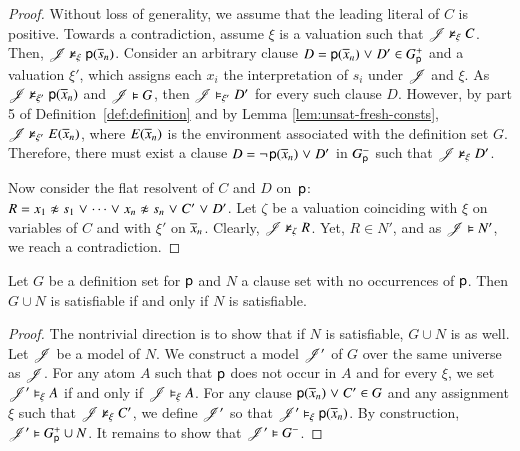 \begin{rep}
\begin{proof}
      Without loss of generality,
      we assume that the leading literal of $C$ is positive.
      Towards a contradiction, assume $\xi$ is a valuation such that $\mathscr{J} \nvDash_\xi C$. Then, $\mathscr{J} \nvDash_\xi
      {\mathsf{p}(\overline{s}_{n})}$. 
      Consider an arbitrary clause $D = {\mathsf{p}}(\overline{x}_{n}) \mathrel{\lor} D'
      \in G^+_{\mathsf{p}}$ and a valuation $\xi'$, which assigns each $x_i$ the
      interpretation of $s_i$ under $\mathscr{J}$ and $\xi$. As $\mathscr{J} \nvDash_{\xi'}
      {\mathsf{p}}(\overline{x}_{n})$ and $\mathscr{J} \vDash G$, then $\mathscr{J} \vDash_{\xi'} D'$ for every
      such clause $D$.
      However, by part 5 of Definition~\ref{def:definition} and by Lemma
      \ref{lem:unsat-fresh-consts}, $\mathscr{J} \nvDash_{\xi'} E(\overline{x}_{n})$, where $E(\overline{x}_{n})$
      is the environment associated with the definition set $G$.
      Therefore, there must exist a clause $D =
      \neg{\kern.2ex \relax{\mathsf{p}(\overline{x}_{n})}} \mathrel{\lor} D'$ in $G^-_{\mathsf{p}}$ such
      that $\mathscr{J} \nvDash_\xi D'$.


      Now consider the flat resolvent of $C$ and $D$ on~$\mathsf{p}$: $R =
      \neqlit{x_1}{s_1} \cor \cdots \cor \neqlit{x_n}{s_n} \cor C' \cor D'$.
      Let $\zeta$ be a valuation coinciding with $\xi$ on variables of $C$
      and with $\xi'$ on $\overline{x}_{n}$.
      Clearly, $\mathscr{J} \nvDash_\zeta R$. Yet, $R \in N'$, and as $\mathscr{J} \vDash N'$, we reach a contradiction.
   \end{proof}

   \begin{lemma}
      \label{lem:flat-res-set-last-step-satisfiability}
      Let $G$ be a definition set for $\mathsf{p}$\confrep{,}{} and $N$ a clause set with no occurrences of $\mathsf{p}$.
      Then $G \cup N$ is satisfiable if and only if $N$ is satisfiable.
   \end{lemma}
   \begin{proof}
      The nontrivial direction is to show that if $N$ is satisfiable, $G \cup N$ is as well.
      Let $\mathscr{J}$ be a model of $N$. We construct a model $\mathscr{J}'$ of $G$ over
      the same universe as $\mathscr{J}$. For any atom $A$ such that $\mathsf{p}$ does not
      occur in $A$ and for every $\xi$, we set $\mathscr{J}' \vDash_\xi A$ if and only if
      $\mathscr{J} \vDash_\xi A$. For any clause ${\mathsf{p}(\overline{x}_{n})} \mathrel{\lor}
      C' \in G$ and any assignment $\xi$ such that $\mathscr{J} \nvDash_\xi C'$, we
      define $\mathscr{J}'$ so that $\mathscr{J}'\vDash_\xi \mathsf{p}(\overline{x}_{n})$. By
      construction, $\mathscr{J}' \vDash G^+_{\mathsf{p}} \cup N$. It remains to show that $\mathscr{J}' \vDash
      G^-_{}$.


\end{proof}
\end{rep}

